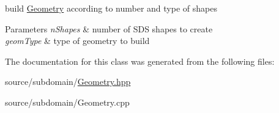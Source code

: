 build \mbox{\hyperlink{classGeometry}{Geometry}} according to number and type of shapes


\begin{DoxyParams}{Parameters}
{\em n\+Shapes} & number of S\+DS shapes to create \\
\hline
{\em geom\+Type} & type of geometry to build \\
\hline
\end{DoxyParams}


The documentation for this class was generated from the following files\+:\begin{DoxyCompactItemize}
\item 
source/subdomain/\mbox{\hyperlink{Geometry_8hpp}{Geometry.\+hpp}}\item 
source/subdomain/Geometry.\+cpp\end{DoxyCompactItemize}
